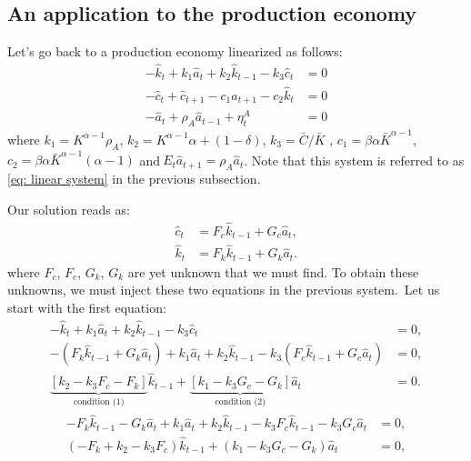 \documentclass[a4paper,12pt]{article}%
\begin{document}
\subsection{An application to the production economy}

Let's go back to a production economy linearized as follows:%
\begin{align*}
-\hat{k}_{t}+k_{1}\hat{a}_{t}+k_{2}\hat{k}_{t-1}-k_{3}\hat{c}_{t}  &  =0\\
-\hat{c}_{t}+\hat{c}_{t+1}-c_{1}\hat{a}_{t+1}-c_{2}\hat{k}_{t}  &  =0\\
-\hat{a}_{t}+\rho_{A}\hat{a}_{t-1}+\eta_{t}^{A}  &  =0
\end{align*}
where $k_{1}=K^{\alpha-1}\rho_{A}$, $k_{2}=K^{\alpha-1}\alpha+\left(
1-\delta\right)  $, $k_{3}=\bar{C}/\bar{K}$ , $c_{1}=\beta\alpha\bar
{K}^{\alpha-1}$, $c_{2}=\beta\alpha\bar{K}^{\alpha-1}\left(  \alpha-1\right)
$ and$\ E_{t}\hat{a}_{t+1}=\rho_{A}\hat{a}_{t}$. Note that this system is
referred to as \autoref{eq: linear system} in the previous subsection.

Our solution reads as:%
\begin{align}
\hat{c}_{t}  &  =F_{c}\hat{k}_{t-1}+G_{c}\hat{a}_{t},\label{eq PQc}\\
\hat{k}_{t}  &  =F_{k}\hat{k}_{t-1}+G_{k}\hat{a}_{t}.
\end{align}
where $F_{c}$, $F_{c}$, $G_{k}$, $G_{k}$ are yet unknown that we must find. To
obtain these unknowns, we must inject these two equations in the previous
system.\ Let us start with the first equation:
\begin{align*}
-\hat{k}_{t}+k_{1}\hat{a}_{t}+k_{2}\hat{k}_{t-1}-k_{3}\hat{c}_{t}  &  =0,\\
-\left(  F_{k}\hat{k}_{t-1}+G_{k}\hat{a}_{t}\right)  +k_{1}\hat{a}_{t}%
+k_{2}\hat{k}_{t-1}-k_{3}\left(  F_{c}\hat{k}_{t-1}+G_{c}\hat{a}_{t}\right)
&  =0,\\
\underset{\text{condition (1)}}{\underbrace{\left[  k_{2}-k_{3}F_{c}%
-F_{k}\right]  }}\hat{k}_{t-1}+\underset{\text{condition (2)}}{\underbrace
{\left[  k_{1}-k_{3}G_{c}-G_{k}\right]  }}\hat{a}_{t}  &  =0.
\end{align*}%
\begin{align*}
-F_{k}\hat{k}_{t-1}-G_{k}\hat{a}_{t}+k_{1}\hat{a}_{t}+k_{2}\hat{k}_{t-1}%
-k_{3}F_{c}\hat{k}_{t-1}-k_{3}G_{c}\hat{a}_{t}  &  =0,\\
\left(  -F_{k}+k_{2}-k_{3}F_{c}\right)  \hat{k}_{t-1}+\left(  k_{1}-k_{3}%
G_{c}-G_{k}\right)  \hat{a}_{t}  &  =0,
\end{align*}
\end{document}
